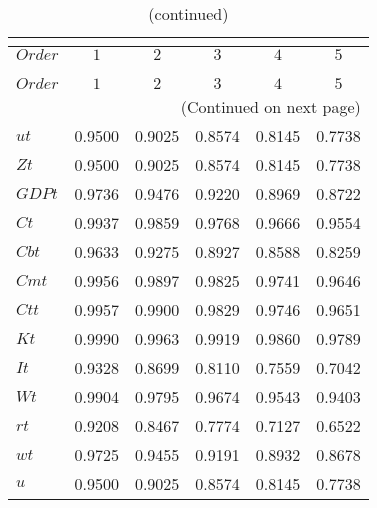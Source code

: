  
\begin{center}
\begin{longtable}{lccccc} 
\caption{COEFFICIENTS OF AUTOCORRELATION}\\
 \label{Table:th_autocorr_matrix}\\
\toprule 
$Order   $	 & 	 $         1$	 & 	 $         2$	 & 	 $         3$	 & 	 $         4$	 & 	 $         5$\\
\midrule \endfirsthead 
\caption{(continued)}\\
 \toprule \\ 
$Order   $	 & 	 $         1$	 & 	 $         2$	 & 	 $         3$	 & 	 $         4$	 & 	 $         5$\\
\midrule \endhead 
\midrule \multicolumn{6}{r}{(Continued on next page)} \\ \bottomrule \endfoot 
\bottomrule \endlastfoot 
$ut      $	 & 	    0.9500	 & 	    0.9025	 & 	    0.8574	 & 	    0.8145	 & 	    0.7738 \\ 
$Zt      $	 & 	    0.9500	 & 	    0.9025	 & 	    0.8574	 & 	    0.8145	 & 	    0.7738 \\ 
$GDPt    $	 & 	    0.9736	 & 	    0.9476	 & 	    0.9220	 & 	    0.8969	 & 	    0.8722 \\ 
$Ct      $	 & 	    0.9937	 & 	    0.9859	 & 	    0.9768	 & 	    0.9666	 & 	    0.9554 \\ 
$Cbt     $	 & 	    0.9633	 & 	    0.9275	 & 	    0.8927	 & 	    0.8588	 & 	    0.8259 \\ 
$Cmt     $	 & 	    0.9956	 & 	    0.9897	 & 	    0.9825	 & 	    0.9741	 & 	    0.9646 \\ 
$Ctt     $	 & 	    0.9957	 & 	    0.9900	 & 	    0.9829	 & 	    0.9746	 & 	    0.9651 \\ 
$Kt      $	 & 	    0.9990	 & 	    0.9963	 & 	    0.9919	 & 	    0.9860	 & 	    0.9789 \\ 
$It      $	 & 	    0.9328	 & 	    0.8699	 & 	    0.8110	 & 	    0.7559	 & 	    0.7042 \\ 
$Wt      $	 & 	    0.9904	 & 	    0.9795	 & 	    0.9674	 & 	    0.9543	 & 	    0.9403 \\ 
$rt      $	 & 	    0.9208	 & 	    0.8467	 & 	    0.7774	 & 	    0.7127	 & 	    0.6522 \\ 
$wt      $	 & 	    0.9725	 & 	    0.9455	 & 	    0.9191	 & 	    0.8932	 & 	    0.8678 \\ 
$u       $	 & 	    0.9500	 & 	    0.9025	 & 	    0.8574	 & 	    0.8145	 & 	    0.7738 \\ 

\end{longtable}
\end{center}
